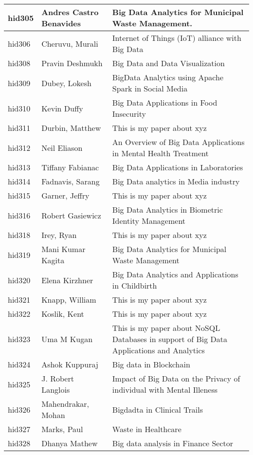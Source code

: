 \documentclass[12pt]{article}
\begin{document}
\begin{footnotesize}
\begin{longtable}{|p{1cm}p{5cm}p{9cm}|}
hid305 & Andres Castro Benavides & Big Data Analytics for Municipal Waste Management.  \\
\hline
hid306 & Cheruvu, Murali & Internet of Things (IoT) alliance with Big Data  \\
\hline
hid308 & Pravin Deshmukh & Big Data and Data Visualization  \\
\hline
hid309 & Dubey, Lokesh & BigData Analytics using Apache Spark in Social Media  \\
\hline
hid310 & Kevin Duffy & Big Data Applications in Food Insecurity  \\
\hline
hid311 & Durbin, Matthew & This is my paper about xyz  \\
\hline
hid312 & Neil Eliason & An Overview of Big Data Applications in Mental Health Treatment  \\
\hline
hid313 & Tiffany Fabianac & Big Data Applications in Laboratories  \\
\hline
hid314 & Fadnavis, Sarang & Big Data analytics in Media industry  \\
\hline
hid315 & Garner, Jeffry & This is my paper about xyz  \\
\hline
hid316 & Robert Gasiewicz & Big Data Analytics in Biometric Identity Management  \\
\hline
hid318 & Irey, Ryan & This is my paper about xyz  \\
\hline
hid319 & Mani Kumar Kagita & Big Data Analytics for Municipal Waste Management  \\
\hline
hid320 & Elena Kirzhner & Big Data Analytics and Applications in Childbirth  \\
\hline
hid321 & Knapp, William & This is my paper about xyz  \\
\hline
hid322 & Koslik, Kent & This is my paper about xyz  \\
\hline
hid323 & Uma M Kugan & This is my paper about NoSQL Databases in support of Big Data Applications and Analytics  \\
\hline
hid324 & Ashok Kuppuraj & Big data in Blockchain  \\
\hline
hid325 & J. Robert Langlois & Impact of Big Data on the Privacy of individual with Mental Illeness  \\
\hline
hid326 & Mahendrakar, Mohan & Bigdadta in Clinical Trails  \\
\hline
hid327 & Marks, Paul & Waste in Healthcare  \\
\hline
hid328 & Dhanya Mathew & Big data analysis in Finance Sector  \\

\end{longtable}
\end{footnotesize}
\end{document}
